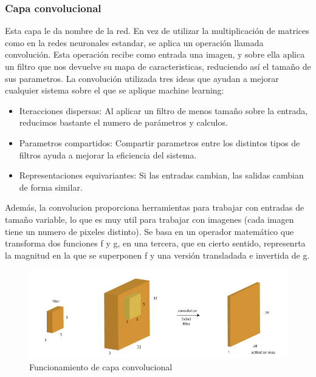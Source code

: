 \subsubsection{Capa convolucional}
Esta capa le da nombre de la red. En vez de utilizar la multiplicación de matrices como en la redes neuronales estandar, se aplica un operación llamada convolución. Esta operación recibe como entrada una imagen, y sobre ella aplica un filtro que nos devuelve su mapa de caracteristicas, reduciendo así el tamaño de sus parametros. La convolución utilizada tres ideas que ayudan a mejorar cualquier sistema sobre el que se aplique machine learning:
\begin{itemize}
\item{Iteracciones dispersas:}
Al aplicar un filtro de menos tamaño sobre la entrada, reducimos bastante el numero de parámetros y calculos.
\item{Parametros compartidos:}
Compartir parametros entre los distintos tipos de filtros ayuda a mejorar la eficiencia del sistema.
\item{Representaciones equivariantes:}
Si las entradas cambian, las salidas cambian de forma similar.
\end{itemize}
Además, la convolucion proporciona herramientas para trabajar con entradas de tamaño variable, lo que es muy util para trabajar con imagenes (cada imagen tiene un numero de pixeles distinto). Se basa en un operador matemático que transforma dos funciones f y g, en una tercera, que en cierto sentido, represenrta la magnitud en la que se superponen f y una versión transladada e invertida de g.
\begin{figure}[htp]
\centering
\includegraphics[scale=0.7]{images/conv_layer.png}
\caption{Funcionamiento de capa convolucional}
\end{figure}\\
